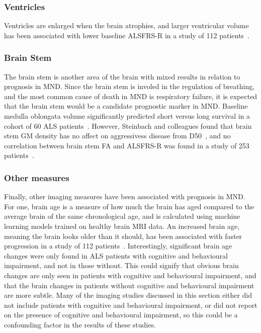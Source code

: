 \subsubsection*{Ventricles}
Ventricles are enlarged when the brain atrophies, and larger ventricular volume has been associated with lower baseline ALSFRS-R in a study of 112 patients~\cite{westenengSubcorticalStructuresAmyotrophic2015}.

\subsubsection*{Brain Stem}
The brain stem is another area of the brain with mixed results in relation to prognosis in MND.
Since the brain stem is involed in the regulation of breathing, and the most common cause of death in MND is respiratory failure, it is expected that the brain stem would be a candidate prognostic marker in MND.
Baseline medulla oblongata volume significantly predicted short versus long survival in a cohort of 60 ALS patients~\cite{milellaMedullaOblongataVolume2022}.
However, Steinbach and colleagues found that brain stem GM density has no affect on aggressivess disease from D50~\cite{steinbachApplyingD50Disease2020}, and no correlation between brain stem FA and ALSFRS-R was found in a study of 253 patients~\cite{mullerLargescaleMulticentreCerebral2016}.

\subsubsection*{Other measures}
Finally, other imaging measures have been associated with prognosis in MND.
For one, brain age is a measure of how much the brain has aged compared to the average brain of the same chronological age, and is calculated using machine learning models trained on healthy brain MRI data.
An increased brain age, meaning the brain looks older than it should, has been associated with faster progression in a study of 112 patients~\cite{hermannCognitiveBehaviouralNot2022}.
Interestingly, significant brain age changes were only found in ALS patients with cognitive and behavioural impairment, and not in those without. This could signify that obvious brain changes are only seen in patients with cognitive and behavioural impairment, and that the brain changes in patients without cognitive and behavioural impairment are more subtle.
Many of the imaging studies discussed in this section either did not include patients with cognitive and behavioural impairment, or did not report on the presence of cognitive and behavioural impairment, so this could be a confounding factor in the results of these studies.

